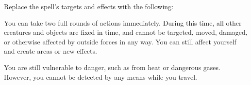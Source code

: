 Replace the spell's targets and effects with the following:
\begin{spellcontent}

\begin{augmenttargetinginfo}




\end{augmenttargetinginfo}


\begin{augmenteffects}



\spelleffect
You can take two full rounds of actions immediately.
During this time, all other creatures and objects are fixed in time, and cannot be targeted, moved, damaged, or otherwise affected by outside forces in any way.
You can still affect yourself and create areas or new effects.

You are still vulnerable to danger, such as from heat or dangerous gases.
However, you cannot be detected by any means while you travel.








\end{augmenteffects}

\end{spellcontent}




